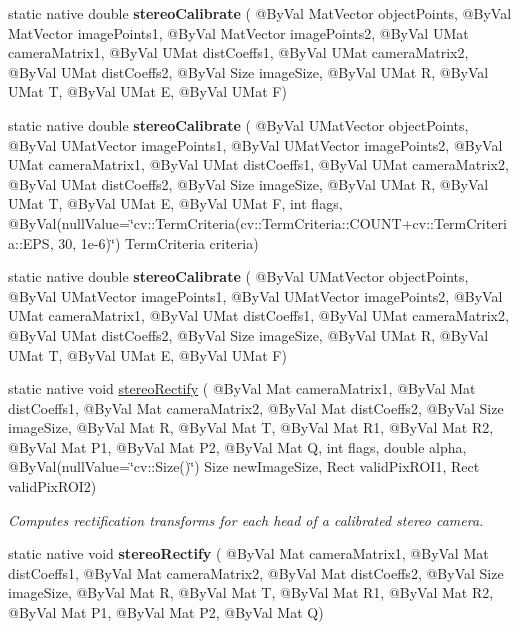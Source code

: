 \begin{DoxyCompactItemize}
\item 
static native double {\bfseries stereo\+Calibrate} ( @By\+Val Mat\+Vector object\+Points, @By\+Val Mat\+Vector image\+Points1, @By\+Val Mat\+Vector image\+Points2, @By\+Val U\+Mat camera\+Matrix1, @By\+Val U\+Mat dist\+Coeffs1, @By\+Val U\+Mat camera\+Matrix2, @By\+Val U\+Mat dist\+Coeffs2, @By\+Val Size image\+Size, @By\+Val U\+Mat R, @By\+Val U\+Mat T, @By\+Val U\+Mat E, @By\+Val U\+Mat F)
\item 
static native double {\bfseries stereo\+Calibrate} ( @By\+Val U\+Mat\+Vector object\+Points, @By\+Val U\+Mat\+Vector image\+Points1, @By\+Val U\+Mat\+Vector image\+Points2, @By\+Val U\+Mat camera\+Matrix1, @By\+Val U\+Mat dist\+Coeffs1, @By\+Val U\+Mat camera\+Matrix2, @By\+Val U\+Mat dist\+Coeffs2, @By\+Val Size image\+Size, @By\+Val U\+Mat R, @By\+Val U\+Mat T, @By\+Val U\+Mat E, @By\+Val U\+Mat F, int flags, @By\+Val(null\+Value=\char`\"{}cv\+::\+Term\+Criteria(cv\+::\+Term\+Criteria\+::\+C\+O\+U\+NT+cv\+::\+Term\+Criteria\+::\+E\+PS, 30, 1e-\/6)\char`\"{}) Term\+Criteria criteria)
\item 
static native double {\bfseries stereo\+Calibrate} ( @By\+Val U\+Mat\+Vector object\+Points, @By\+Val U\+Mat\+Vector image\+Points1, @By\+Val U\+Mat\+Vector image\+Points2, @By\+Val U\+Mat camera\+Matrix1, @By\+Val U\+Mat dist\+Coeffs1, @By\+Val U\+Mat camera\+Matrix2, @By\+Val U\+Mat dist\+Coeffs2, @By\+Val Size image\+Size, @By\+Val U\+Mat R, @By\+Val U\+Mat T, @By\+Val U\+Mat E, @By\+Val U\+Mat F)
\item 
static native void \hyperlink{group__calib3d_ga10101a04b035018f2589ecc315d38ce5}{stereo\+Rectify} ( @By\+Val Mat camera\+Matrix1, @By\+Val Mat dist\+Coeffs1, @By\+Val Mat camera\+Matrix2, @By\+Val Mat dist\+Coeffs2, @By\+Val Size image\+Size, @By\+Val Mat R, @By\+Val Mat T, @By\+Val Mat R1, @By\+Val Mat R2, @By\+Val Mat P1, @By\+Val Mat P2, @By\+Val Mat Q, int flags, double alpha, @By\+Val(null\+Value=\char`\"{}cv\+::\+Size()\char`\"{}) Size new\+Image\+Size, Rect valid\+Pix\+R\+O\+I1, Rect valid\+Pix\+R\+O\+I2)
\begin{DoxyCompactList}\small\item\em Computes rectification transforms for each head of a calibrated stereo camera. \end{DoxyCompactList}\item 
static native void {\bfseries stereo\+Rectify} ( @By\+Val Mat camera\+Matrix1, @By\+Val Mat dist\+Coeffs1, @By\+Val Mat camera\+Matrix2, @By\+Val Mat dist\+Coeffs2, @By\+Val Size image\+Size, @By\+Val Mat R, @By\+Val Mat T, @By\+Val Mat R1, @By\+Val Mat R2, @By\+Val Mat P1, @By\+Val Mat P2, @By\+Val Mat Q)

\end{DoxyCompactItemize}
